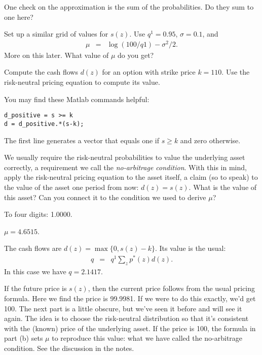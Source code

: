 \documentclass[11pt]{exam}
\begin{document}
\begin{questions}
\begin{parts}
\item One check on the approximation is the sum of the probabilities.
Do they sum to one here?

\item Set up a similar grid of values for $s(z)$.
Use $q^1 = 0.95$, $\sigma = 0.1$, and
\begin{eqnarray*}
    \mu &=&  \log(100/q1) - \sigma^2/2 .
\end{eqnarray*}
More on this later.
What value of $\mu$ do you get?

\item Compute the cash flows $d(z)$ for an option
with strike price $k=110$.
Use the risk-neutral pricing equation to compute its value.

You may find these Matlab commands helpful:
\begin{verbatim}
d_positive = s >= k
d = d_positive.*(s-k);
\end{verbatim}
The first line generates a vector that equals one if $ s \geq k$ and zero otherwise.

\item We usually require the risk-neutral probabilities to value the underlying
asset correctly, a requirement we call the {\it no-arbitrage condition\/}.
With this in mind, apply the risk-neutral pricing equation to the asset itself,
a claim (so to speak) to the value of the asset one period from now:
$d(z) = s(z)$.
What is the value of this asset?
Can you connect it to the condition we used to derive $\mu$?
\end{parts}

\begin{solution}
\begin{parts}
\item To four digits:  1.0000. 

\item $\mu = 4.6515$. 

\item The cash flows are $ d(z) = \max \{ 0, s(z) - k \} $.
Its value is the usual:  
\begin{eqnarray*}
    q &=& q^1 \sum_z p^*(z) d(z) .
\end{eqnarray*} 
In this case we have $ q = 2.1417 $. 

\item If the future price is $s(z)$, 
then the current price follows from the usual pricing formula.
Here we find the price is 99.9981.  
If we were to do this exactly, we'd get 100.
The next part is a little obscure, but we've seen it before and will see it again.
The idea is to choose the risk-neutral distribution so that it's consistent
with the (known) price of the underlying asset.  
If the price is 100, the formula in part (b) sets $\mu$ to reproduce
this value:  what we have called the no-arbitrage condition.
See the discussion in the notes.  
\end{parts} 
\end{solution}

\end{questions}


\end{document}
